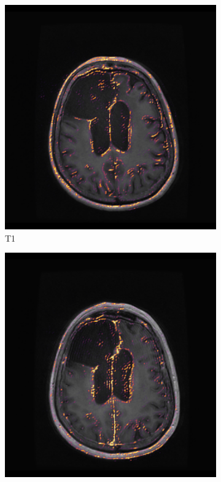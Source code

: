 \begin{figure}
    \centering

    \setlength{\figexamplewidth}{0.22\textwidth}

    \begin{subfigure}[t]{\figexamplewidth}
        \centering
        \includegraphics[width=\textwidth]{Figures/T1_saliency}
        \caption{\gls{T1}}\label{fig:T1Cam}
    \end{subfigure}
    \begin{subfigure}[t]{\figexamplewidth}
        \centering
        \includegraphics[width=\textwidth]{Figures/T1GD_saliency}

\end{subfigure}
\end{figure}
